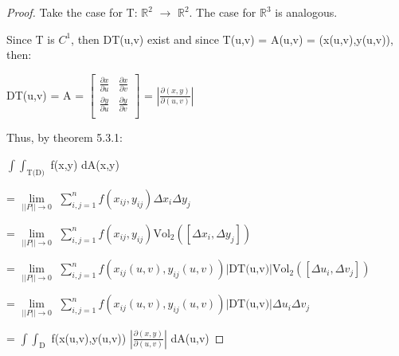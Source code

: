     \begin{proof}
        Take the case for T: $\mathbb{R}^2$ $\rightarrow$ $\mathbb{R}^2$.
        The case for $\mathbb{R}^3$ is analogous.

        Since T is $C^1$, then DT(u,v) exist and since
        T(u,v) = A(u,v) = (x(u,v),y(u,v)), then:

        \hspace{0.5cm}
        DT(u,v) = A =
        $
        \begin{bmatrix}
            \frac{\partial x}{\partial u} & \frac{\partial x}{\partial v} \\
            \frac{\partial y}{\partial u} & \frac{\partial y}{\partial v} \\
        \end{bmatrix}
        $
        = $|\frac{\partial(x,y)}{\partial(u,v)}|$

        Thus, by {\color{red} theorem 5.3.1}:

        \hspace{0.5cm}
        $\int \int_\text{T(D)}$ f(x,y) dA(x,y)

        \hspace{0.5cm}
        = $\underset{||P|| \rightarrow 0}{\lim}$
            $\sum_{i,j=1}^n f(x_{ij},y_{ij}) \Delta x_i \Delta y_j$

        \hspace{0.5cm}
        = $\underset{||P|| \rightarrow 0}{\lim}$
            $\sum_{i,j=1}^n f(x_{ij},y_{ij})
            \text{Vol}_2([\Delta x_i , \Delta y_j])$

        \hspace{0.5cm}
        = $\underset{||P|| \rightarrow 0}{\lim}$
            $\sum_{i,j=1}^n f(x_{ij}(u,v),y_{ij}(u,v))
            |\text{DT(u,v)}| \text{Vol}_2([\Delta u_i , \Delta v_j])$

        \hspace{0.5cm}
        = $\underset{||P|| \rightarrow 0}{\lim}$
            $\sum_{i,j=1}^n f(x_{ij}(u,v),y_{ij}(u,v))
            |\text{DT(u,v)}| \Delta u_i \Delta v_j$

        \hspace{0.5cm}
        = $\int \int_\text{D}$ f(x(u,v),y(u,v))
            $|\frac{\partial(x,y)}{\partial(u,v)}|$ dA(u,v)
    \end{proof}




